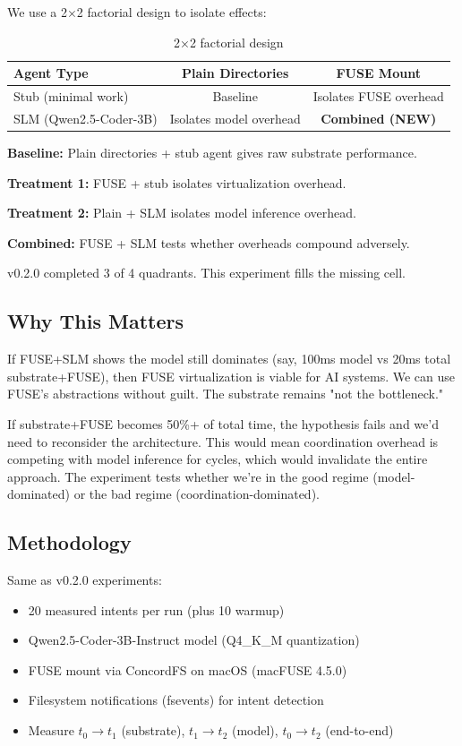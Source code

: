\documentclass[11pt]{article}
\begin{document}
We use a 2×2 factorial design to isolate effects:

\begin{table}[h]
\centering
\begin{tabular}{lcc}
\toprule
\textbf{Agent Type} & \textbf{Plain Directories} & \textbf{FUSE Mount} \\
\midrule
Stub (minimal work) & Baseline & Isolates FUSE overhead \\
SLM (Qwen2.5-Coder-3B) & Isolates model overhead & \textbf{Combined (NEW)} \\
\bottomrule
\end{tabular}
\caption{2×2 factorial design}
\end{table}

\textbf{Baseline:} Plain directories + stub agent gives raw substrate performance.

\textbf{Treatment 1:} FUSE + stub isolates virtualization overhead.

\textbf{Treatment 2:} Plain + SLM isolates model inference overhead.

\textbf{Combined:} FUSE + SLM tests whether overheads compound adversely.

v0.2.0 completed 3 of 4 quadrants. This experiment fills the missing cell.

\subsection{Why This Matters}

If FUSE+SLM shows the model still dominates (say, 100ms model vs 20ms total substrate+FUSE), then FUSE virtualization is viable for AI systems. We can use FUSE's abstractions without guilt. The substrate remains "not the bottleneck."

If substrate+FUSE becomes 50\%+ of total time, the hypothesis fails and we'd need to reconsider the architecture. This would mean coordination overhead is competing with model inference for cycles, which would invalidate the entire approach. The experiment tests whether we're in the good regime (model-dominated) or the bad regime (coordination-dominated).

\subsection{Methodology}

Same as v0.2.0 experiments:
\begin{itemize}
\item 20 measured intents per run (plus 10 warmup)
\item Qwen2.5-Coder-3B-Instruct model (Q4\_K\_M quantization)
\item FUSE mount via ConcordFS on macOS (macFUSE 4.5.0)
\item Filesystem notifications (fsevents) for intent detection
\item Measure $t_0 \rightarrow t_1$ (substrate), $t_1 \rightarrow t_2$ (model), $t_0 \rightarrow t_2$ (end-to-end)
\end{itemize}
\end{document}
